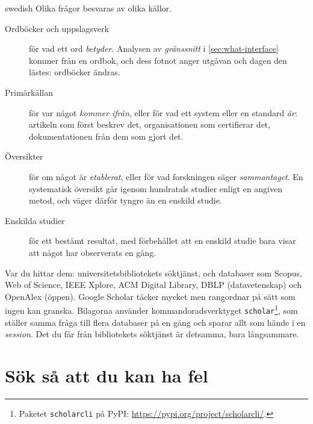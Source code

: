 \begin{onlyin}{swedish}
Olika frågor besvaras av olika källor.
\begin{description}
  \item[Ordböcker och uppslagsverk] för vad ett ord \emph{betyder}.
    Analysen av \emph{gränssnitt} i \cref{sec:what-interface} kommer
    från en ordbok, och dess fotnot anger utgåvan och dagen den lästes:
    ordböcker ändras.
  \item[Primärkällan] för var något \emph{kommer ifrån}, eller för vad
    ett system eller en standard \emph{är}: artikeln som först beskrev
    det, organisationen som certifierar det, dokumentationen från dem
    som gjort det.
  \item[Översikter] för om något är \emph{etablerat}, eller för vad
    forskningen säger \emph{sammantaget}.  En systematisk översikt går
    igenom hundratals studier enligt en angiven metod, och väger därför
    tyngre än en enskild studie.
  \item[Enskilda studier] för ett bestämt resultat, med förbehållet att
    en enskild studie bara visar att något har observerats en gång.
\end{description}
Var du hittar dem: universitetsbibliotekets söktjänst, och databaser som
Scopus, Web of Science, IEEE Xplore, ACM Digital Library, DBLP
(datavetenskap) och OpenAlex (öppen).  Google Scholar täcker mycket men
rangordnar på sätt som ingen kan granska.  Bilagorna använder
kommandoradsverktyget \texttt{scholar}\footnote{Paketet
\texttt{scholarcli} på PyPI:
\url{https://pypi.org/project/scholarcli/}.}, som ställer samma fråga
till flera databaser på en gång och sparar allt som hände i en
\emph{session}.  Det du får från bibliotekets söktjänst är detsamma,
bara långsammare.
\end{onlyin}

\section{%
  {Sök så att du kan ha fel}} %

